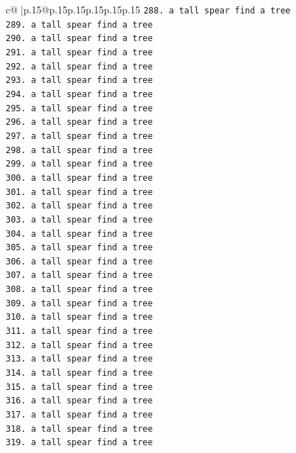 \documentclass{article}
\begin{document}
{\begin{supertabular}{c@{$\;$}|p{.15\linewidth}@{}p{.15\linewidth}p{.15\linewidth}p{.15\linewidth}p{.15\linewidth}p{.15\linewidth}}
{{{\texttt{288. a tall spear find a tree} \\
\texttt{289. a tall spear find a tree} \\
\texttt{290. a tall spear find a tree} \\
\texttt{291. a tall spear find a tree} \\
\texttt{292. a tall spear find a tree} \\
\texttt{293. a tall spear find a tree} \\
\texttt{294. a tall spear find a tree} \\
\texttt{295. a tall spear find a tree} \\
\texttt{296. a tall spear find a tree} \\
\texttt{297. a tall spear find a tree} \\
\texttt{298. a tall spear find a tree} \\
\texttt{299. a tall spear find a tree} \\
\texttt{300. a tall spear find a tree} \\
\texttt{301. a tall spear find a tree} \\
\texttt{302. a tall spear find a tree} \\
\texttt{303. a tall spear find a tree} \\
\texttt{304. a tall spear find a tree} \\
\texttt{305. a tall spear find a tree} \\
\texttt{306. a tall spear find a tree} \\
\texttt{307. a tall spear find a tree} \\
\texttt{308. a tall spear find a tree} \\
\texttt{309. a tall spear find a tree} \\
\texttt{310. a tall spear find a tree} \\
\texttt{311. a tall spear find a tree} \\
\texttt{312. a tall spear find a tree} \\
\texttt{313. a tall spear find a tree} \\
\texttt{314. a tall spear find a tree} \\
\texttt{315. a tall spear find a tree} \\
\texttt{316. a tall spear find a tree} \\
\texttt{317. a tall spear find a tree} \\
\texttt{318. a tall spear find a tree} \\
\texttt{319. a tall spear find a tree} \\
}}}
\end{supertabular}}
\end{document}
